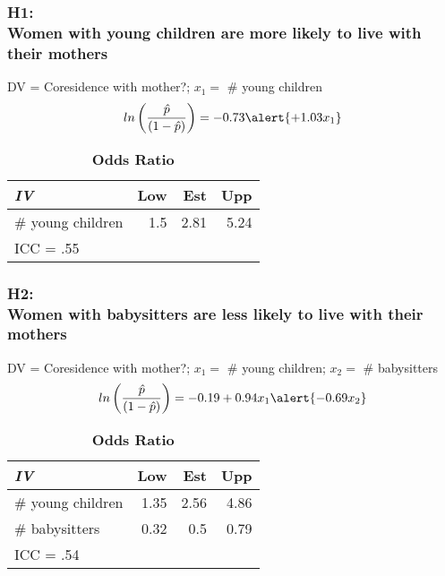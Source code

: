 \documentclass{beamer}
\begin{document}
\begin{frame}
\frametitle{H1: \\ Women with young children are more likely to live with their mothers}

DV = Coresidence with mother?;
\alert{$x_1 =$ \# young children}
\begin{equation*}
ln\left(\frac{\hat{p}}{(1 - \hat{p})}\right) = -0.73 \alert{ + 1.03x_{1}}
\end{equation*}

\begin{table}[h]
\caption {\textbf{Odds Ratio}}
  \centering
  \begin{tabular}{| l | r r r|} 
  	\hline
	\emph{IV} & Low & Est & Upp \\ \hline
	\# young children & \alert{1.5} & \alert{2.81} & \alert{5.24}\\	 \hline
	\multicolumn{4}{l}{ICC = .55}\\
  \end{tabular}
\end{table}
\end{frame}


\begin{frame}
\frametitle{H2: \\ Women with babysitters are less likely to live with their mothers}

DV = Coresidence with mother?;
$x_1 =$ \# young children; \alert{$x_2 =$ \# babysitters}
\begin{equation*}
ln\left(\frac{\hat{p}}{(1 - \hat{p})}\right) = -0.19 + 0.94x_{1} \alert{ - 0.69x_{2}}
\end{equation*}

\begin{table}[h]
\caption {\textbf{Odds Ratio}}
  \centering
  \begin{tabular}{| l | r r r|} 
  	\hline
	\emph{IV} & Low & Est & Upp \\ \hline
	\# young children & 1.35 & 2.56 & 4.86\\
	\# babysitters & \alert{0.32} & \alert{0.5} & \alert{0.79}\\	 \hline
	\multicolumn{4}{l}{ICC = .54}\\
  \end{tabular}
\end{table}
\end{frame}

\end{document}
